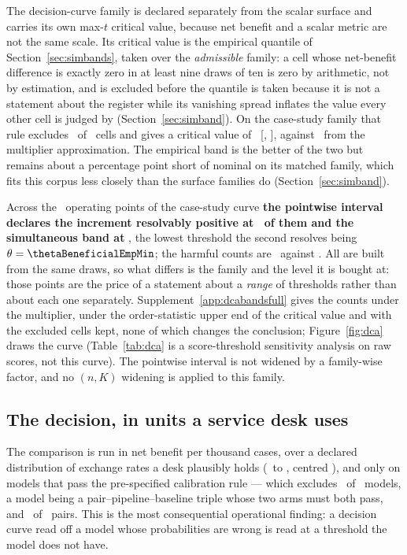 The decision-curve family is declared separately from the scalar surface and
carries its own max\nobreakdash-$t$ critical value, because net benefit and a scalar
metric are not the same scale. Its critical value is the empirical
quantile of Section~\ref{sec:simbands}, taken over the \emph{admissible}
family: a cell whose net-benefit difference is exactly zero in at least nine
draws of ten is zero by arithmetic, not by estimation, and is excluded before
the quantile is taken because it is not a statement about the register while
its vanishing spread inflates the value every other cell is judged by
(Section~\ref{sec:simband}). On the case-study family that rule excludes
\nDcaCellsExcludedDegenerate\ of \nDcaFamily\ cells and gives a critical
value of \dcaQEmp\ [\dcaQEmpLo, \dcaQEmpHi], against \dcaQ\ from the
multiplier approximation. The empirical band is the better of the two but
remains about a percentage point short of nominal on its matched family,
which fits this corpus less closely than the surface families do
(Section~\ref{sec:simband}).

Across the \nDcGrid\ operating points of the case-study curve \textbf{the
pointwise interval declares the increment resolvably positive at
\nBeneficialPointwise\ of them and the simultaneous band at
\nBeneficialSimultaneousEmp}, the lowest threshold the second resolves
being $\theta = \thetaBeneficialEmpMin$; the harmful counts are
\nHarmfulPointwise\ against \nHarmfulSimultaneousEmp. All are built from the
same draws, so what differs is the family and the level it is bought at:
those points are the price of a statement about a \emph{range} of thresholds
rather than about each one separately. Supplement~\ref{app:dcabandsfull}
gives the counts under the multiplier, under the order-statistic upper end of
the critical value and with the excluded cells kept, none of which changes
the conclusion; Figure~\ref{fig:dca} draws the curve (Table~\ref{tab:dca} is
a score-threshold sensitivity analysis on raw scores, not this curve). The
pointwise interval is not widened by a family-wise factor, and no $(n,K)$
widening is applied to this family.

\subsection{The decision, in units a service desk uses}
\label{sec:nbregret}

The comparison is run in net benefit per thousand cases, over a declared
distribution of exchange rates a desk plausibly holds
(\deskQlo\ to \deskQhi, centred \deskQmid), and only on models that pass the
pre-specified calibration rule --- which excludes \nModelsDcaExcluded\ of
\nModelsDca\ models, a model being a pair--pipeline--baseline triple whose
two arms must both pass, and \nPairsDcaExcluded\ of \nPairs\ pairs.
This is the most consequential operational finding: a decision curve read off
a model whose probabilities are wrong is read at a threshold the model does
not have.

